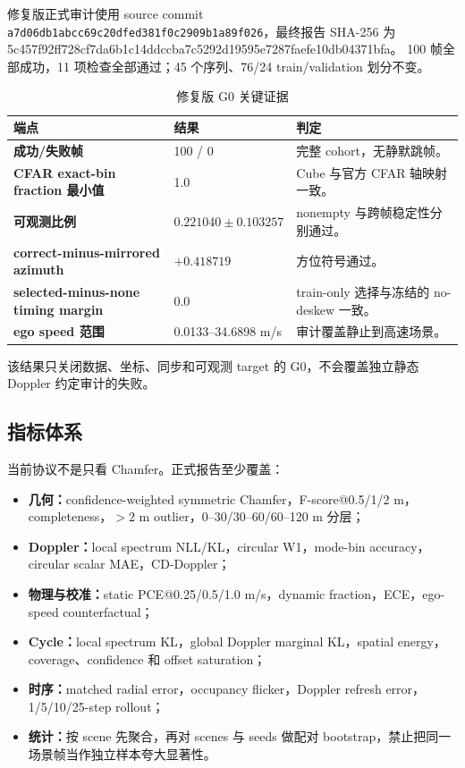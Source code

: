 \documentclass[11pt,a4paper,fontset=none]{ctexart}
\newcommand{\code}[1]{\texttt{#1}}
\newcommand{\hash}[2]{{\small\ttfamily #1\allowbreak{}#2}}
\begin{document}
修复版正式审计使用 source commit
\code{a7d06db1abcc69c20dfed381f0c2909b1a89f026}，最终报告 SHA-256 为
\hash{5c457f92ff728cf7da6b1c14ddccba7c}{5292d19595e7287faefe10db04371bfa}。
100 帧全部成功，11 项检查全部通过；45 个序列、76/24 train/validation 划分不变。

\begin{table}[H]
\centering
\caption{修复版 G0 关键证据}
\begin{tabularx}{\textwidth}{>{\bfseries}p{5.0cm} p{3.0cm} X}
\toprule
端点 & 结果 & 判定 \\
\midrule
成功/失败帧 & 100 / 0 & 完整 cohort，无静默跳帧。\\
CFAR exact-bin fraction 最小值 & 1.0 & Cube 与官方 CFAR 轴映射一致。\\
可观测比例 & $0.221040\pm0.103257$ & nonempty 与跨帧稳定性分别通过。\\
correct-minus-mirrored azimuth & $+0.418719$ & 方位符号通过。\\
selected-minus-none timing margin & $0.0$ & train-only 选择与冻结的 no-deskew 一致。\\
ego speed 范围 & 0.0133--34.6898 m/s & 审计覆盖静止到高速场景。\\
\bottomrule
\end{tabularx}
\end{table}

该结果只关闭数据、坐标、同步和可观测 target 的 G0，不会覆盖独立静态 Doppler 约定审计的失败。

\subsection{指标体系}

当前协议不是只看 Chamfer。正式报告至少覆盖：
\begin{itemize}
  \item \textbf{几何：}confidence-weighted symmetric Chamfer，F-score@0.5/1/2 m，completeness，$>2$ m outlier，0--30/30--60/60--120 m 分层；
  \item \textbf{Doppler：}local spectrum NLL/KL，circular W1，mode-bin accuracy，circular scalar MAE，CD-Doppler；
  \item \textbf{物理与校准：}static PCE@0.25/0.5/1.0 m/s，dynamic fraction，ECE，ego-speed counterfactual；
  \item \textbf{Cycle：}local spectrum KL，global Doppler marginal KL，spatial energy，coverage、confidence 和 offset saturation；
  \item \textbf{时序：}matched radial error，occupancy flicker，Doppler refresh error，1/5/10/25-step rollout；
  \item \textbf{统计：}按 scene 先聚合，再对 scenes 与 seeds 做配对 bootstrap，禁止把同一场景帧当作独立样本夸大显著性。
\end{itemize}
\end{document}
